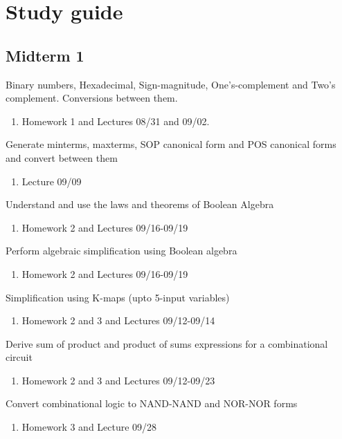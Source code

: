 \documentclass[options]{article}
\newcommand{\hilight}[1]{\setlength{\fboxsep}{1pt}\colorbox{red}{#1}}
\newcommand{\cmark}{\ding{51}}%
\newcommand{\done}{\rlap{$\square$}{\raisebox{2pt}{\large\hspace{1pt}\cmark}}%
  \hspace{-2.5pt}}
\newcommand{\important}{\hilight{\rlap{$\square$}{\raisebox{2pt}{\large\hspace{1pt}\cmark}}}%
  \hspace{-2.5pt}}
\begin{document}
\section{Study guide}
\subsection{Midterm 1}
\begin{todolist}
  \item[\done] Binary numbers, Hexadecimal, Sign-magnitude, One's-complement and
    Two's complement. Conversions between them.
    \begin{enumerate}
      \item Homework 1 and Lectures 08/31 and 09/02.
    \end{enumerate}
  \item[\important] Generate minterms, maxterms, SOP canonical form and POS
    canonical forms and convert between them\\
  \begin{enumerate}
    \item Lecture 09/09
  \end{enumerate}
  \item[\done]  Understand and use the laws and theorems of Boolean Algebra
  \begin{enumerate}
    \item Homework 2 and Lectures 09/16-09/19
  \end{enumerate}
  \item[\done]  Perform algebraic simplification using Boolean algebra
  \begin{enumerate}
    \item Homework 2 and Lectures 09/16-09/19
  \end{enumerate}
  \item[\important]  Simplification using K-maps (upto 5-input variables)
    \begin{enumerate}
    \item Homework 2 and 3 and Lectures 09/12-09/14
    \end{enumerate}
  \item[\important]  Derive sum of product and product of sums expressions for a combinational circuit
    \begin{enumerate}
    \item Homework 2 and 3 and Lectures 09/12-09/23
    \end{enumerate}
  \item[\important]  Convert combinational logic to NAND-NAND and NOR-NOR forms
    \begin{enumerate}
    \item Homework 3 and Lecture 09/28
    \end{enumerate}
\end{todolist}
\end{document}
